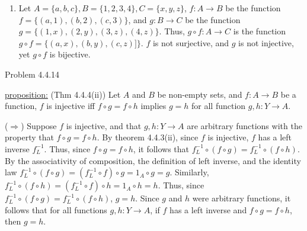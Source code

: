 \documentclass{article}
\theoremstyle{definition}
\begin{document}
	\begin{enumerate}
%
%
%
%

		\item[4] Let $A=\{a,b,c\}, B=\{1,2,3,4\}, C=\{x,y,z\}$,
		$f:A\rightarrow B$ be the function $f=\{(a,1),(b,2),(c,3)\}$, and
		$g:B\rightarrow C$ be the function $g=\{(1,x),(2,y),(3,z),(4,z)\}$.
		Thus, $g\circ f:A\rightarrow C$ is the function $g\circ f=\{(a,x),
		(b,y),(c,z)]\}$.  $f$ is not surjective, and $g$ is not injective,
		yet $g\circ f$ is bijective.

	\end{enumerate}

	\vspace{1cm}


	\noindent Problem 4.4.14  \vspace{0.3cm}

	\underline{proposition:} (Thm 4.4.4(ii)) Let $A$ and $B$ be
	non-empty sets, and $f:A\rightarrow B$ be a function, $f$ is
	injective iff $f\circ g=f\circ h$ implies $g=h$ for all function
	$g,h:Y\rightarrow A$.

	\vspace{0.2cm}


	\vspace{0.2cm}

	($\Rightarrow$)  Suppose $f$ is injective, and that
	$g,h:Y\rightarrow A$ are arbitrary functions with the property that
	$f\circ g = f\circ h$. By theorem 4.4.3(ii), since $f$ is
	injective, $f$ has a left inverse $f_L^{-1}$. Thus, since $f\circ
	g= f\circ h$, it follows that $f_L^{-1}\circ(f\circ
	g)=f_L^{-1}\circ(f\circ h)$. By the associativity of composition,
	the definition of left inverse, and the identity law
	$f_L^{-1}\circ(f\circ g)=(f_L^{-1}\circ f)\circ g=1_A\circ g=g$.
	Similarly, $f_L^{-1}\circ(f\circ h )=(f_L^{-1}\circ f)\circ
	h=1_A\circ h=h$. Thus, since $f_L^{-1}\circ(f\circ
	g)=f_L^{-1}\circ(f\circ h)$, $g=h$. Since $g$ and $h$ were
	arbitrary functions, it follows that for all functions
	$g,h:Y\rightarrow A$, if $f$ has a left inverse and $f\circ g=
	f\circ h$, then $g=h$.
\end{document}
